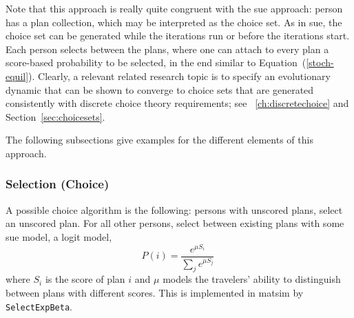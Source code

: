 Note that this approach is really quite congruent with the \gls{sue}
approach:  person has a plan collection, which may be
interpreted as the choice set.  As in \gls{sue}, the choice set can be
generated while the iterations run\corr{,}{} or before the iterations start.
Each person selects between the plans, where one can attach to
every plan a score-based probability to be selected, 
in the end similar to Equation~(\ref{stoch-equil}).
Clearly, a relevant  related research topic is to specify 
an evolutionary dynamic that can be shown to converge to choice sets
that are generated consistently with discrete choice theory requirements; 
see ~\ref{ch:discretechoice} and
Section~\ref{sec:choicesets}.



The following subsections give examples for the different elements of
this approach.


\subsubsection{Selection (Choice)}
\label{sec:ag-based-assignment-selection}

A possible choice algorithm is the following:  persons with
unscored plans, select an unscored plan.  For all other persons,
select between existing plans with some \gls{sue} model, \eg a logit
model, \ie
\begin{equation}
P(i) = \frac{e^{\mu S_i}}{\sum_j e^{\mu S_j}} \
\label{eq:2}
\end{equation}
where $S_i$ is the score of plan $i$ and $\mu$ models the
travelers' ability to distinguish between plans with different
scores.
%
This is implemented in \gls{matsim} by \lstinline{SelectExpBeta}.

